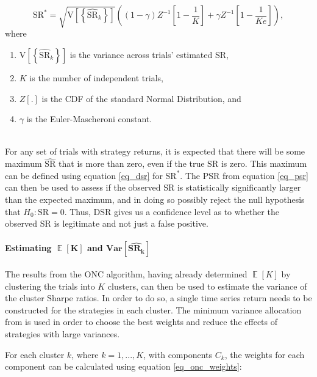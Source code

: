 \documentclass[a4paper,11pt,oneside]{article}
\newcommand{\Var}{\mathbf{Var}}
\DeclareMathOperator*{\E}{\mathbb{E}}
\theoremstyle{plain}
\theoremstyle{definition}
\begin{document}
	\begin{equation}\label{eq_dsr}
	\mathrm{SR}^{*}=\sqrt{\mathrm{V}\left[\left\{\widehat{\mathrm{SR}}_{k}\right\}\right]}\left((1-\gamma) Z^{-1}\left[1-\frac{1}{K}\right]+\gamma Z^{-1}\left[1-\frac{1}{K e}\right]\right), 
	\end{equation}
	where
	\begin{enumerate}
		\item $\mathrm{V}\left[\left\{\widehat{\mathrm{SR}}_{k}\right\}\right]$ is the variance across trials' estimated SR, 
		\item $K$ is the number of independent trials, 
		\item $Z[.]$ is the CDF of the standard Normal Distribution, and
		\item $\gamma$ is the Euler-Mascheroni constant.
	\end{enumerate}
	~\\
	For any set of trials with strategy returns, it is expected that there will be some maximum $\widehat{\mathrm{SR}}$ that is more than zero, even if the true $\mathrm{SR}$ is zero. This maximum can be defined using equation \eqref{eq_dsr} for $\mathrm{SR}^*$. The PSR from equation \eqref{eq_psr} can then be used to assess if the observed SR is statistically significantly larger than the expected maximum, and in doing so possibly reject the null hypothesis that $H_0: \mathrm{SR} = 0$. Thus, DSR gives us a confidence level as to whether the observed SR is legitimate and not just a false positive.
	
	\paragraph{Estimating $\mathbf{\E}\left[\mathbf{K}\right]$ and $\mathbf{\Var}\left[\widehat{\mathbf{SR_k}}\right]$}\label{dsr_cluster_estimates}
	
	The results from the ONC algorithm, having already determined $\mathbf{\E}\left[K\right]$ by clustering the trials into $K$ clusters, can then be used to estimate the variance of the cluster Sharpe ratios. In order to do so, a single time series return needs to be constructed for the strategies in each cluster. The minimum variance allocation from \citet{LopezPrado2016a} is used in order to choose the best weights and reduce the effects of strategies with large variances.\newline

	For each cluster $k$, where $k = 1, ..., K$, with components $C_k$, the weights for each component can be calculated using equation \eqref{eq_onc_weights}:
	
\end{document}
